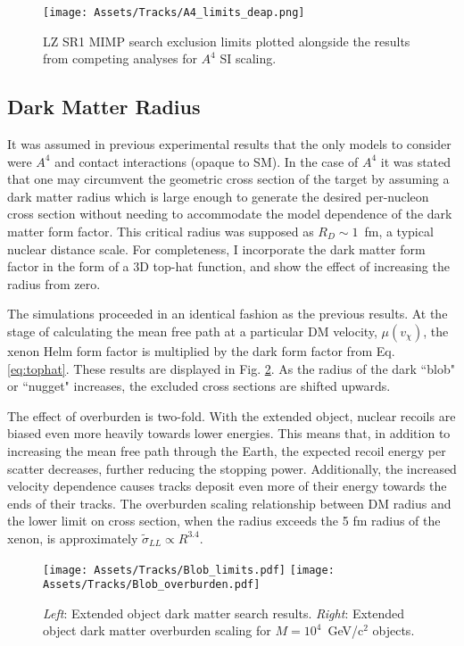 \begin{figure}
    \centering
    \texttt{[image: Assets/Tracks/A4\_limits\_deap.png]}
    \caption{LZ SR1 MIMP search exclusion limits plotted alongside the results from competing analyses for $A^4$ SI scaling.}
    \label{fig:global_mimp}
\end{figure}
\subsection{Dark Matter Radius}

It was assumed in previous experimental results \cite{clark_direct_2020, lai_planck_2021} that the only models to consider were $A^4$ and contact interactions (opaque to SM).
In the case of $A^4$ it was stated that one may circumvent the geometric cross section of the target by assuming a dark matter radius which is large enough to generate the desired per-nucleon cross section without needing to accommodate the model dependence of the dark matter form factor.
This critical radius was supposed as $R_D\sim 1$~fm, a typical nuclear distance scale.
For completeness, I incorporate the dark matter form factor in the form of a 3D top-hat function, and show the effect of increasing the radius from zero.

The simulations proceeded in an identical fashion as the previous results.
At the stage of calculating the mean free path at a particular DM velocity, $\mu (v_\chi)$, the xenon Helm\cite{helm_inelastic_1956} form factor is multiplied by the dark form factor from Eq. \ref{eq:tophat}.
These results are displayed in Fig. \ref{fig:blob_radius}.
As the radius of the dark ``blob" or ``nugget" increases, the excluded cross sections are shifted upwards.

The effect of overburden is two-fold. 
With the extended object, nuclear recoils are biased even more heavily towards lower energies.
This means that, in addition to increasing the mean free path through the Earth, the expected recoil energy per scatter decreases, further reducing the stopping power.
Additionally, the increased velocity dependence causes tracks deposit even more of their energy towards the ends of their tracks.
The overburden scaling relationship between DM radius and the lower limit on cross section, when the radius exceeds the 5 fm radius of the xenon, is approximately $\tilde \sigma_{LL} \propto R^{3.4}$.

\begin{figure}
    \centering
    \texttt{[image: Assets/Tracks/Blob\_limits.pdf]}
    \texttt{[image: Assets/Tracks/Blob\_overburden.pdf]}
    \caption[Nugget search results.]%
    {\textit{Left}: Extended object dark matter search results.
    \textit{Right}: Extended object dark matter overburden scaling for $M=10^4$~GeV/c$^2$ objects.}
    \label{fig:blob_radius}
\end{figure}




